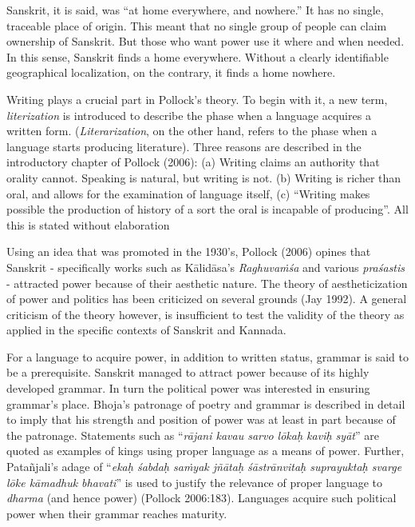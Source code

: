 Sanskrit, it is said, was “at home everywhere, and nowhere.” It has no single, traceable place of origin. This meant that no single group of people can claim ownership of Sanskrit. But those who want power use it where and when needed. In this sense, Sanskrit finds a home everywhere. Without a clearly identifiable geographical localization, on the contrary, it finds a home nowhere.

Writing plays a crucial part in Pollock’s theory. To begin with it, a new term, {\sl literization} is introduced to describe the phase when a language acquires a written form. ({\sl Literarization}, on the other hand, refers to the phase when a language starts producing literature). Three reasons are described in the introductory chapter of Pollock (2006): (a) Writing claims an authority that orality cannot. Speaking is natural, but writing is not. (b) Writing is richer than oral, and allows for the examination of language itself, (c) “Writing makes possible the production of history of a sort the oral is incapable of producing”. All this is stated without elaboration

Using an idea that was promoted in the 1930’s, Pollock (2006) opines that Sanskrit - specifically works such as Kālidāsa’s {\sl Raghuvaṁśa} and various {\sl praśastis} - attracted power because of their aesthetic nature. The theory of aestheticization of power and politics has been criticized on several grounds (Jay 1992). A general criticism of the theory however, is insufficient to test the validity of the theory as applied in the specific contexts of Sanskrit and Kannada. 

For a language to acquire power, in addition to written status, grammar is said to be a prerequisite. Sanskrit managed to attract power because of its highly developed grammar. In turn the political power was interested in ensuring grammar’s place. Bhoja’s patronage of poetry and grammar is described in detail to imply that his strength and position of power was at least in part because of the patronage. Statements such as “{\sl rājani kavau sarvo lōkaḥ kaviḥ syāt}” are quoted as examples of kings using proper language as a means of power. Further, Patañjali’s adage of “{\sl ekaḥ śabdaḥ saṁyak jñātaḥ śāstrānvitaḥ suprayuktaḥ svarge lōke kāmadhuk bhavati}” is used to justify the relevance of proper language to {\sl dharma} (and hence power) (Pollock 2006:183). Languages acquire such political power when their grammar reaches maturity.

